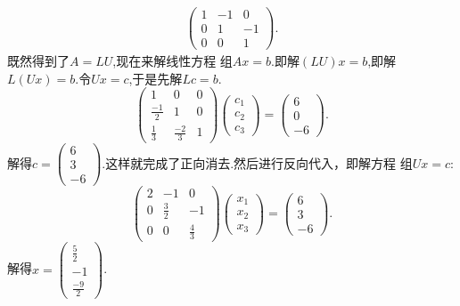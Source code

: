 ﻿\documentclass{book} \usepackage{exsheets} \usepackage{xeCJK}
\begin{document}
\begin{solution}
\begin{align*}
                                                                                                                                                                                    \begin{pmatrix}
                                                                                                                                                                                      1&-1&0\\
                                                                                                                                                                                      0&1&-1\\
                                                                                                                                                                                      0&0&1
                                                                                                                                                                                    \end{pmatrix}.
\end{align*}
既然得到了$A=LU$,现在来解线性方程
组$Ax=b$.即解$(LU)x=b$,即解$L(Ux)=b$.令$Ux=c$,于是先解$Lc=b$.
$$
\begin{pmatrix}
  1&0&0\\
  \frac{-1}{2}&1&0\\
  \frac{1}{3}&\frac{-2}{3}&1
\end{pmatrix}
\begin{pmatrix}
  c_1\\
  c_2\\
  c_3
\end{pmatrix}=
\begin{pmatrix}
  6\\
  0\\
  -6
\end{pmatrix}.
$$
解得$c=
\begin{pmatrix}
  6\\
  3\\
  -6
\end{pmatrix}.  $这样就完成了正向消去.然后进行反向代入，即解方程
组$Ux=c$:
$$
\begin{pmatrix}
  2&-1&0\\
  0&\frac{3}{2}&-1\\
  0&0&\frac{4}{3}
\end{pmatrix}
\begin{pmatrix}
  x_1\\
  x_2\\
  x_3
\end{pmatrix}=
\begin{pmatrix}
  6\\
  3\\
  -6
\end{pmatrix}.
$$
解得$x=
\begin{pmatrix}
  \frac{5}{2}\\
  -1\\
  \frac{-9}{2}
\end{pmatrix}
$.
\end{solution}
\end{document}
